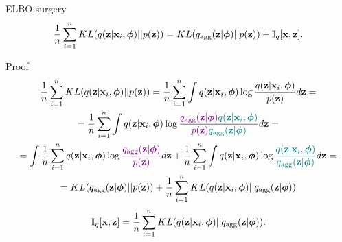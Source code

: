 \begin{frame}{ELBO surgery}
		\vspace{-0.3cm}
		\[
		    \frac{1}{n} \sum_{i=1}^n KL(q(\mathbf{z} | \mathbf{x}_i, \boldsymbol{\phi}) || p(\mathbf{z})) = KL(q_{\text{agg}}(\mathbf{z} | \boldsymbol{\phi}) || p(\mathbf{z})) + \mathbb{I}_q [\mathbf{x}, \mathbf{z}].
		\]
		\vspace{-0.3cm}
	\begin{block}{Proof}
		\vspace{-0.5cm}
		{\footnotesize
		\begin{multline*}
		    \frac{1}{n} \sum_{i=1}^n KL(q(\mathbf{z} | \mathbf{x}_i, \boldsymbol{\phi}) || p(\mathbf{z})) = \frac{1}{n} \sum_{i=1}^n \int q(\mathbf{z} | \mathbf{x}_i, \boldsymbol{\phi}) \log \frac{q(\mathbf{z} | \mathbf{x}_i, \boldsymbol{\phi})}{p(\mathbf{z})} d \mathbf{z} = \\
		    = \frac{1}{n} \sum_{i=1}^n \int q(\mathbf{z} | \mathbf{x}_i, \boldsymbol{\phi}) \log \frac{{\color{violet}q_{\text{agg}}(\mathbf{z} | \boldsymbol{\phi})} {\color{teal}q(\mathbf{z} | \mathbf{x}_i, \boldsymbol{\phi})}}{{\color{violet}p(\mathbf{z})} {\color{teal}q_{\text{agg}}(\mathbf{z} | \boldsymbol{\phi})}} d \mathbf{z} = \\
		    = \int \frac{1}{n} \sum_{i=1}^n  q(\mathbf{z} | \mathbf{x}_i, \boldsymbol{\phi}) \log {\color{violet}\frac{q_{\text{agg}}(\mathbf{z}| \boldsymbol{\phi})}{p(\mathbf{z})}} d \mathbf{z}
		    + \frac{1}{n}\sum_{i=1}^n \int q(\mathbf{z} | \mathbf{x}_i, \boldsymbol{\phi}) \log {\color{teal}\frac{q(\mathbf{z}| \mathbf{x}_i, \boldsymbol{\phi})}{q_{\text{agg}}(\mathbf{z}| \boldsymbol{\phi})}} d \mathbf{z} = \\
		    = KL (q_{\text{agg}}(\mathbf{z} | \boldsymbol{\phi}) || p(\mathbf{z})) + \frac{1}{n}\sum_{i=1}^n KL(q(\mathbf{z} | \mathbf{x}_i, \boldsymbol{\phi}) || q_{\text{agg}}(\mathbf{z} | \boldsymbol{\phi}))
		\end{multline*}
		}
		\vspace{-0.4cm}
		\[
			\mathbb{I}_{q} [\mathbf{x}, \mathbf{z}] = \frac{1}{n}\sum_{i=1}^n KL(q(\mathbf{z} | \mathbf{x}_i, \boldsymbol{\phi}) || q_{\text{agg}}(\mathbf{z} | \boldsymbol{\phi})).
		\]
	\end{block}

\end{frame}
